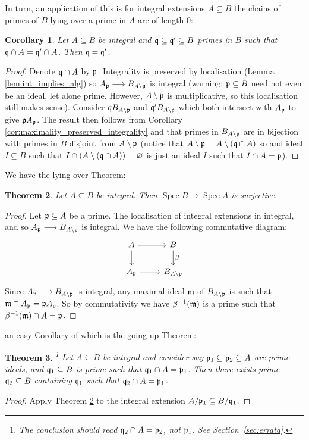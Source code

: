\documentclass[12pt]{article}
\theoremstyle{plain}
\newtheorem{thm}{Theorem}[subsection] %
\newtheorem{cor}[thm]{Corollary}
\theoremstyle{definition}
\newcommand{\lto}{\longrightarrow}
\begin{document}
In turn, an application of this is for integral extensions $A \subseteq B$ the chains of primes of $B$ lying over a prime in $A$ are of length $0$:
\begin{cor}
Let $A \subseteq B$ be integral and $\frak{q}\subseteq \frak{q}' \subseteq B$ primes in $B$ such that $\frak{q} \cap A = \frak{q}' \cap A$. Then $\frak{q} = \frak{q}'$.
\end{cor}
\begin{proof}
Denote $\frak{q} \cap A$ by $\frak{p}$. Integrality is preserved by localisation (Lemma \ref{lem:int_implies_alg}) so $A_\frak{p} \lto B_{A\setminus\frak{p}}$ is integral (warning: $\frak{p} \subseteq B$ need not even be an ideal, let alone prime. However, $A\setminus \frak{p}$ is multiplicative, so this localisation still makes sense). Consider $\frak{q}B_{A\setminus\frak{p}}$ and $\frak{q}'B_{A\setminus\frak{p}}$ which both intersect with $A_\frak{p}$ to give $\frak{p}A_\frak{p}$. The result then follows from Corollary \ref{cor:maximality_preserved_integrality} and that primes in $B_{A\setminus\frak{p}}$ are in bijection with primes in $B$ disjoint from ${A\setminus\frak{p}}$ (notice that $A\setminus \frak{p} = A\setminus (\frak{q} \cap A)$ so and ideal $I \subseteq B$ such that $I \cap (A\setminus(\frak{q} \cap A)) = \varnothing$ is just an ideal $I$ such that $I \cap A = \frak{p}$).
\end{proof}
We have the lying over Theorem:
\begin{thm}
\label{thm:lying_over}
Let $A \subseteq B$ be integral. Then $\operatorname{Spec}B \lto \operatorname{Spec}A$ is surjective.
\end{thm}
\begin{proof}
Let $\frak{p} \subseteq A$ be a prime. The localisation of integral extensions in integral, and so $A_\frak{p} \lto B_{A\setminus\frak{p}}$ is integral. We have the following commutative diagram:
\[
\begin{tikzcd}
A\arrow[r]\arrow[d] & B\arrow[d,"{\beta}"]\\
A_\frak{p}\arrow[r] & B_{A\setminus\frak{p}}
\end{tikzcd}
\]
Since $A_\frak{p} \lto B_{A\setminus\frak{p}}$ is integral, any maximal ideal $\frak{m}$ of $B_{A\setminus\frak{p}}$ is such that $\frak{m} \cap A_\frak{p} = \frak{p}A_\frak{p}$. So by commutativity we have $\beta^{-1}(\frak{m})$ is a prime such that $\beta^{-1}(\frak{m}) \cap A = \frak{p}$.
\end{proof}
an easy Corollary of which is the going up Theorem:
\begin{thm}\footnote{The conclusion should read $\frak{q}_2\cap A=\frak{p}_2$, not $\frak{p}_1$. See Section~\ref{sec:errata}.}
Let $A \subseteq B$ be integral and consider say $\frak{p}_1 \subseteq \frak{p}_2 \subseteq A$ are prime ideals, and $\frak{q}_1 \subseteq B$ is prime such that $\frak{q}_1 \cap A = \frak{p}_1$. Then there exists prime $\frak{q}_2 \subseteq B$ containing $\frak{q}_1$ such that $\frak{q}_2 \cap A = \frak{p}_1$.
\end{thm}
\begin{proof}
Apply Theorem \ref{thm:lying_over} to the integral extension $A/\frak{p}_1 \subseteq B/\frak{q}_1$.
\end{proof}
\end{document}
